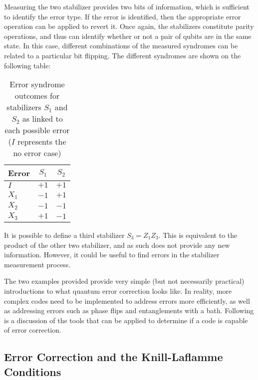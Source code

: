 Measuring the two stabilizer provides two bits of information, which is sufficient to identify the error type. If the error is identified, then the appropriate error operation can be applied to revert it. Once again, the stabilizers constitute parity operations, and thus can identify whether or not a pair of qubits are in the same state. In this case, different combinations of the measured syndromes can be related to a particular bit flipping. The different syndromes are shown on the following table:
\begin{table}[hbt!]
    \centering
    \begin{tabular}{ l || c | c}
        Error & $S_1$ & $S_2$ \\ 
         \hline \hline
         $I$ & $+1$ & $+1$ \\ 
         $X_1$ & $-1$ & $+1$\\ 
         $X_2$ & $-1$ & $-1$\\
         $X_3$ & $+1$ & $-1$
    \end{tabular}
\caption{Error syndrome outcomes for stabilizers $S_1$ and $S_2$ as linked to each possible error ($I$ represents the no error case)}
\end{table}
It is possible to define a third stabilizer $S_3=Z_1Z_3$. This is equivalent to the product of the other two stabilizer, and as such does not provide any new information. However, it could be useful to find errors in the stabilizer measurement process.

The two examples provided provide very simple (but not necessarily practical) introductions to what quantum error correction looks like. In reality, more complex codes need to be implemented to address errors more efficiently, as well as addressing errors such as phase flips and entanglements with a bath. Following is a discussion of the tools that can be applied to determine if a code is capable of error correction.

\subsection{Error Correction and the Knill-Laflamme Conditions}

